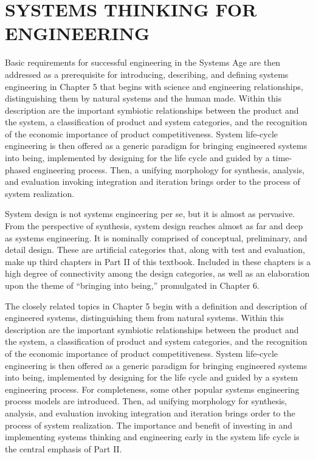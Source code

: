 \part{SYSTEMS THINKING FOR ENGINEERING}\label{part:2}

Basic requirements for successful engineering in the Systems Age are then addressed as a prerequisite for introducing, describing, and defining systems engineering in Chapter 5 that begins with science and engineering relationships, distinguishing them by natural systems and the human made. Within this description are the important symbiotic relationships between the product and the system, a classification of product and system categories, and the recognition of the economic importance of product competitiveness. System life-cycle engineering is then offered as a generic paradigm for bringing engineered systems into being, implemented by designing for the life cycle and guided by a time-phased engineering process. Then, a unifying morphology for synthesis, analysis, and evaluation invoking integration and iteration brings order to the process of system realization.

System design is not systems engineering per se, but it is almost as pervasive. From the perspective of synthesis, system design reaches almost as far and deep as systems engineering. It is nominally comprised of conceptual, preliminary, and detail design. These are artificial categories that, along with test and evaluation, make up third chapters in Part II of this textbook. Included in these chapters is a high degree of connectivity among the design categories, as well as an elaboration upon the theme of ``bringing into being,'' promulgated in Chapter 6.

The closely related topics in Chapter 5 begin with a definition and description of engineered systems, distinguishing them from natural systems. Within this description are the important symbiotic relationships between the product and the system, a classification of product and system categories, and the recognition of the economic importance of product competitiveness. System life-cycle engineering is then offered as a generic paradigm for bringing engineered systems into being, implemented by designing for the life cycle and guided by a system engineering process. For completeness, some other popular systems engineering process models are introduced. Then, ad unifying morphology for synthesis, analysis, and evaluation invoking integration and iteration brings order to the process of system realization. The importance and benefit of investing in and implementing systems thinking and engineering early in the system life cycle is the central emphasis of Part II.